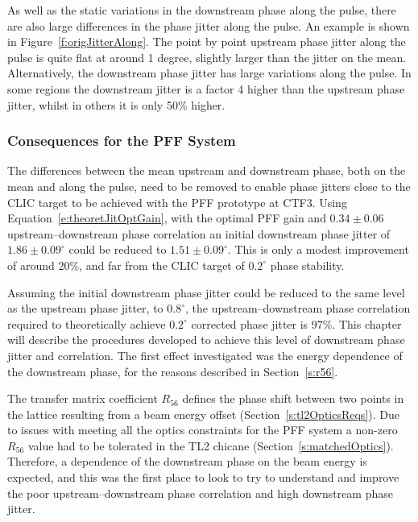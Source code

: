 As well as the static variations in the downstream phase along the pulse, there are also large differences in the phase jitter along the pulse. An example is shown in Figure~\ref{f:origJitterAlong}. The point by point upstream phase jitter along the pulse is quite flat at around 1 degree, slightly larger than the jitter on the mean. Alternatively, the downstream phase jitter has large variations along the pulse. In some regions the downstream jitter is a factor 4 higher than the upstream phase jitter, whilst in others it is only 50\% higher.

\subsubsection{Consequences for the PFF System}

The differences between the mean upstream and downstream phase, both on the mean and along the pulse, need to be removed to enable phase jitters close to the CLIC target to be achieved with the PFF prototype at CTF3. Using Equation~\ref{e:theoretJitOptGain}, with the optimal PFF gain and \(0.34\pm0.06\) upstream--downstream phase correlation an initial downstream phase jitter of \(1.86\pm0.09^\circ\) could be reduced to \(1.51\pm0.09^\circ\). This is only a modest improvement of around 20\%, and far from the CLIC target of \(0.2^\circ\) phase stability. %

Assuming the initial downstream phase jitter could be reduced to the same level as the upstream phase jitter, to \(0.8^\circ\), the upstream--downstream phase correlation required to theoretically achieve \(0.2^\circ\) corrected phase jitter is 97\%. This chapter will describe the procedures developed to achieve this level of downstream phase jitter and correlation. The first effect investigated was the energy dependence of the downstream phase, for the reasons described in Section~\ref{s:r56}.


The transfer matrix coefficient \(R_{56}\) defines the phase shift between two points in the lattice resulting from a beam energy offset (Section~\ref{s:tl2OpticsReqs}). Due to issues with meeting all the optics constraints for the PFF system a non-zero \(R_{56}\) value had to be tolerated in the TL2 chicane (Section~\ref{s:matchedOptics}).  Therefore, a dependence of the downstream phase on the beam energy is expected, and this was the first place to look to try to understand and improve the poor upstream--downstream phase correlation and high downstream phase jitter.

